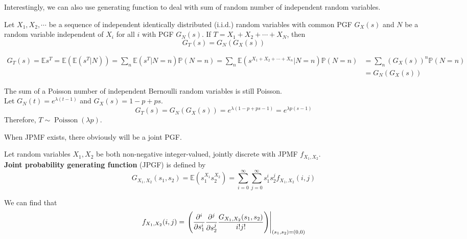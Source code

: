 \documentclass{huhtakm-template-book}
\newcommand{\prob}{\mathbb{P}}
\newcommand{\expect}{\mathbb{E}}
\DeclareMathOperator{\Poisson}{Poisson}
\begin{document}
\newpage
Interestingly, we can also use generating function to deal with sum of random number of independent random variables.
\begin{thm}
	Let $X_{1},X_{2},\cdots$ be a sequence of independent identically distributed (i.i.d.) random variables with common PGF $G_{X}(s)$ and $N$ be a random variable independent of $X_{i}$ for all $i$ with PGF $G_{N}(s)$. If $T=X_{1}+X_{2}+\cdots+X_{N}$, then
	\begin{equation*}
		G_{T}(s)=G_{N}(G_{X}(s))
	\end{equation*}
\end{thm}
\begin{proofing}
	\begin{align*}
		G_{T}(s)=\expect s^{T}=\expect(\expect(s^{T}|N))=\sum_{n}\expect(s^{T}|N=n)\prob(N=n)
		=\sum_{n}\expect(s^{X_{1}+X_{2}+\cdots+X_{n}}|N=n)\prob(N=n)
		&=\sum_{n}(G_{X}(s))^{n}\prob(N=n)\\
		&=G_{N}(G_{X}(s))
	\end{align*}
\end{proofing}
\begin{eg}
	The sum of a Poisson number of independent Bernoulli random variables is still Poisson.\\
	Let $G_{N}(t)=e^{\lambda(t-1)}$ and $G_{X}(s)=1-p+ps$.
	\begin{equation*}
		G_{T}(s)=G_{N}(G_{X}(s))=e^{\lambda(1-p+ps-1)}=e^{\lambda p(s-1)}
	\end{equation*}
	Therefore, $T\sim\Poisson(\lambda p)$.
\end{eg}
When JPMF exists, there obviously will be a joint PGF.
\begin{defn}
	Let random variables $X_{1},X_{2}$ be both non-negative integer-valued, jointly discrete with JPMF $f_{X_{1},X_{2}}$.\\
	\textbf{Joint probability generating function} (JPGF) is defined by
	\begin{equation*}
		G_{X_{1},X_{2}}(s_{1},s_{2})=\expect(s_{1}^{X_{1}}s_{2}^{X_{2}})=\sum_{i=0}^{\infty}\sum_{j=0}^{\infty}s_{1}^{i}s_{2}^{j}f_{X_{1},X_{2}}(i,j)
	\end{equation*}
\end{defn}
\begin{rem}
	We can find that
	\begin{equation*}
		f_{X_{1},X_{2}}(i,j)=\left.\left(\pdv*[order={i}]{\pdv*[order={j}]{\frac{G_{X_{1},X_{2}}(s_{1},s_{2})}{i!j!}}{s_{2}}}{s_{1}}\right)\right|_{(s_{1},s_{2})=(0,0)}
	\end{equation*}
\end{rem}
\end{document}
